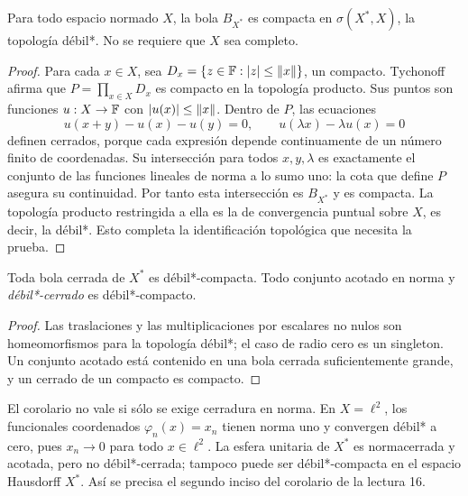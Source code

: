 \begin{teorema}\label{v3:alaoglu}
Para todo espacio normado $X$, la bola $B_{X^*}$ es compacta en $\sigma(X^*,X)$, la topología débil*. No se requiere que $X$ sea completo.
\end{teorema}
\begin{proof}
Para cada $x\in X$, sea $D_x=\{z\in\mathbb F:|z|\leq\left\lVert x\right\rVert\}$, un compacto. Tychonoff afirma que $P=\prod_{x\in X}D_x$ es compacto en la topología producto. Sus puntos son funciones $u:X\to\mathbb F$ con $|u(x)|\leq\left\lVert x\right\rVert$. Dentro de $P$, las ecuaciones
\[
 u(x+y)-u(x)-u(y)=0,\qquad u(\lambda x)-\lambda u(x)=0
\]
definen cerrados, porque cada expresión depende continuamente de un número finito de coordenadas. Su intersección para todos $x,y,\lambda$ es exactamente el conjunto de las funciones lineales de norma a lo sumo uno: la cota que define $P$ asegura su continuidad. Por tanto esta intersección es $B_{X^*}$ y es compacta. La topología producto restringida a ella es la de convergencia puntual sobre $X$, es decir, la débil*. Esto completa la identificación topológica que necesita la prueba.
\end{proof}
\begin{corolario}\label{v3:alaoglu-cor}
Toda bola cerrada de $X^*$ es débil*-compacta. Todo conjunto acotado en norma y \emph{débil*-cerrado} es débil*-compacto.
\end{corolario}
\begin{proof}
Las traslaciones y las multiplicaciones por escalares no nulos son homeomorfismos para la topología débil*; el caso de radio cero es un singleton. Un conjunto acotado está contenido en una bola cerrada suficientemente grande, y un cerrado de un compacto es compacto.
\end{proof}
\begin{observacion}
El corolario no vale si sólo se exige cerradura en norma. En $X=\ell^2$, los funcionales coordenados $\varphi_n(x)=x_n$ tienen norma uno y convergen débil* a cero, pues $x_n\to0$ para todo $x\in\ell^2$. La esfera unitaria de $X^*$ es normacerrada y acotada, pero no débil*-cerrada; tampoco puede ser débil*-compacta en el espacio Hausdorff $X^*$. Así se precisa el segundo inciso del corolario de la lectura 16.
\end{observacion}

